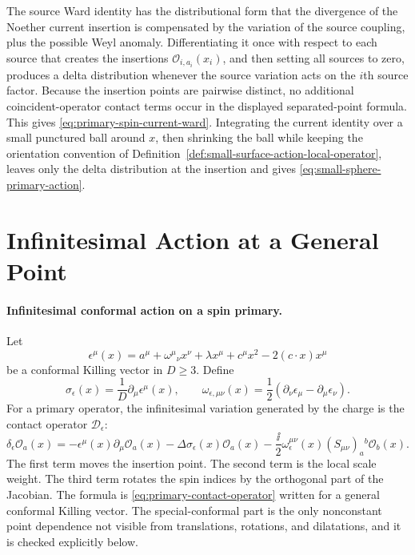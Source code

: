 The source Ward identity has the distributional form that the divergence of
the Noether current insertion is compensated by the variation of the source
coupling, plus the possible Weyl anomaly.  Differentiating it once with
respect to each source that creates the insertions
\(\mathcal O_{i,a_i}(x_i)\), and then setting all sources to zero, produces a
delta distribution whenever the source variation acts on the \(i\)th source
factor.  Because the insertion points are pairwise distinct, no additional
coincident-operator contact terms occur in the displayed separated-point
formula.  This gives \eqref{eq:primary-spin-current-ward}.  Integrating the
current identity over a small punctured ball around \(x\), then shrinking the
ball while keeping the orientation convention of
Definition~\ref{def:small-surface-action-local-operator}, leaves only the
delta distribution at the insertion and gives
\eqref{eq:small-sphere-primary-action}.

\section{Infinitesimal Action at a General Point}

\paragraph{Infinitesimal conformal action on a spin primary.}
Let
\[
  \epsilon^\mu(x)
  =
  a^\mu+\omega^\mu{}_\nu x^\nu+\lambda x^\mu
  +c^\mu x^2-2(c\cdot x)x^\mu
\]
be a conformal Killing vector in \(D\ge3\).  Define
\[
  \sigma_\epsilon(x)=\frac1D\partial_\mu\epsilon^\mu(x),
  \qquad
  \omega_{\epsilon,\mu\nu}(x)
  =
  \frac12(\partial_\nu\epsilon_\mu-\partial_\mu\epsilon_\nu).
\]
For a primary operator, the infinitesimal variation generated by the charge is
the contact operator \(\mathcal D_\epsilon\):
\begin{equation}
  \delta_\epsilon\mathcal O_a(x)
  =
  -\epsilon^\mu(x)\partial_\mu\mathcal O_a(x)
  -\Delta\sigma_\epsilon(x)\mathcal O_a(x)
  -\frac{\ii}{2}\omega_{\epsilon}^{\mu\nu}(x)
  (S_{\mu\nu})_a{}^b\mathcal O_b(x).
  \label{eq:primary-infinitesimal-transform}
\end{equation}
The first term moves the insertion point.  The second term is the local scale
weight.  The third term rotates the spin indices by the orthogonal part of the
Jacobian.
The formula is \eqref{eq:primary-contact-operator} written for a general
conformal Killing vector.  The special-conformal part is the only
nonconstant point dependence not visible from translations, rotations, and
dilatations, and it is checked explicitly below.

